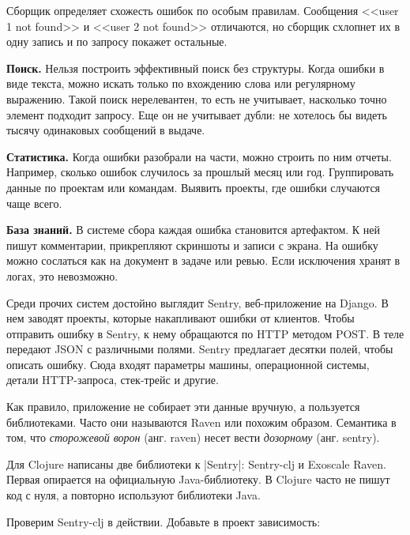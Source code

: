 Сборщик определяет схожесть ошибок по особым правилам. Сообщения <<user 1 not
found>> и <<user 2 not found>> отличаются, но сборщик схлопнет их в одну запись
и по запросу покажет остальные.

\textbf{Поиск.} Нельзя построить эффективный поиск без структуры. Когда ошибки в
виде текста, можно искать только по вхождению слова или регулярному
выражению. Такой поиск нерелевантен, то есть не учитывает, насколько точно
элемент подходит запросу. Еще он не учитывает дубли: не хотелось бы видеть
тысячу одинаковых сообщений в выдаче.

\textbf{Статистика.} Когда ошибки разобрали на части, можно строить по ним
отчеты. Например, сколько ошибок случилось за прошлый месяц или
год. Группировать данные по проектам или командам. Выявить проекты, где ошибки
случаются чаще всего.

\textbf{База знаний.} В системе сбора каждая ошибка становится артефактом. К ней
пишут комментарии, прикрепляют скриншоты и записи с экрана. На ошибку можно
сослаться как на документ в задаче или ревью. Если исключения хранят в логах,
это невозможно.

Среди прочих систем достойно выглядит Sentry,
веб-приложение на Django. В нем заводят проекты, которые накапливают ошибки от
клиентов. Чтобы отправить ошибку в Sentry, к нему обращаются по HTTP методом
POST. В теле передают JSON с различными полями. Sentry предлагает десятки полей,
чтобы описать ошибку. Сюда входят параметры машины, операционной системы, детали
HTTP-запроса, стек-трейс и другие.

Как правило, приложение не собирает эти данные вручную, а пользуется
библиотеками. Часто они называются Raven или похожим образом. Семантика в том,
что \emph{сторожевой ворон} (анг. raven) несет вести \emph{дозорному}
(анг. sentry).

Для Clojure написаны две библиотеки к \spverb|Sentry|:
Sentry-clj и Exoscale
Raven. Первая опирается на
официальную Java-библиотеку. В Clojure часто не пишут код с нуля, а повторно
используют библиотеки Java.

Проверим Sentry-clj в действии. Добавьте в проект зависимость:

\begin{english}
  \begin{clojure}
  \end{clojure}
\end{english}

